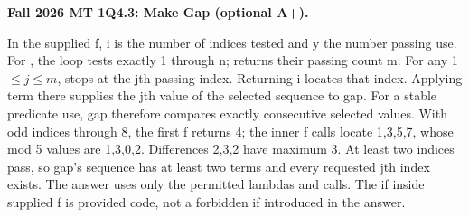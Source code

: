 \documentclass[10pt]{scrartcl}
\begin{document}
\begin{prob}
\textbf{Fall 2026 MT 1Q4.3: Make Gap (optional A+).} 
\begin{steps}
\ii In the supplied f, i is the number of indices tested and y the number passing use. For , the loop tests exactly 1 through n;  returns their passing count m.
\ii For any 1 $\le j\le m$,  stops at the jth passing index. Returning i locates that index. Applying term there supplies the jth value of the selected sequence to gap.
\ii For a stable predicate use, gap therefore compares exactly consecutive selected values. With odd indices through 8, the first f returns 4; the inner f calls locate 1,3,5,7, whose mod 5 values are 1,3,0,2. Differences 2,3,2 have maximum 3.
\ii At least two indices pass, so gap's sequence has at least two terms and every requested jth index exists. The answer uses only the permitted lambdas and calls. The if inside supplied f is provided code, not a forbidden if introduced in the answer.
\end{steps}
\end{prob}
\end{document}
